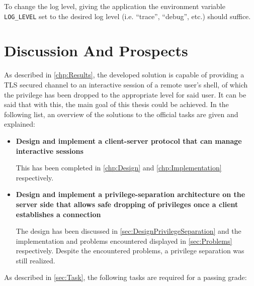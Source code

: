 \documentclass[10pt,a4paper,titlepage,twoside,english,final]{zhawreprt}
\begin{document}
To change the log level, giving the application the environment variable \texttt{LOG\_LEVEL} set to the desired log level (i.e. ``trace'', ``debug'', etc.) should suffice.

\chapter{Discussion And Prospects}\label{chp:DiscussionAndProspects}
As described in \ref{chp:Results}, the developed solution is capable of providing a \gls{TLS} secured channel to an interactive session of a remote user's \gls{shell}, of which the privilege has been dropped to the appropriate level for said user.
It can be said that with this, the main goal of this thesis could be achieved.
In the following list, an overview of the solutions to the official tasks are given and explained:
\begin{itemize}
\item \textbf{Design and implement a client-server protocol that can manage interactive sessions}

This has been completed in \ref{chp:Design} and \ref{chp:Implementation} respectively.

\item \textbf{Design and implement a privilege-separation architecture on the server side that allows safe dropping of privileges once a client establishes a connection}

The design has been discussed in \ref{sec:DesignPrivilegeSeparation} and the implementation and problems encountered displayed in \ref{sec:Problems} respectively.
Despite the encountered problems, a privilege separation was still realized.
\end{itemize}

As described in \ref{sec:Task}, the following tasks are required for a passing grade:
\end{document}

